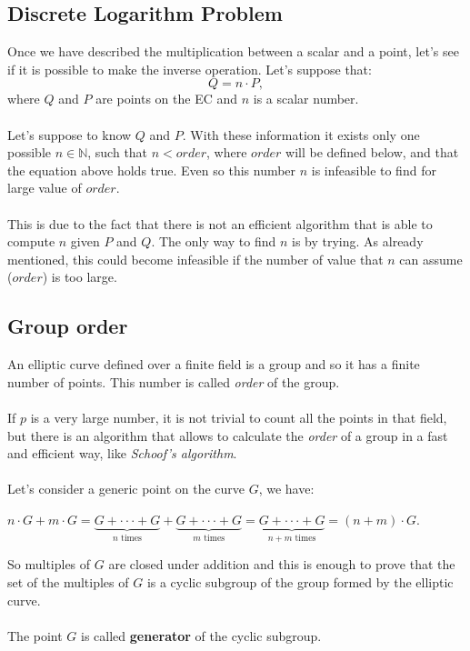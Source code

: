 \subsection{Discrete Logarithm Problem}
Once we have described the multiplication between a scalar and a point, let's see if it is possible to make the inverse operation. Let's suppose that:
\begin{equation*}
Q = n \cdot P,
\end{equation*}
where $Q$ and $P$ are points on the EC and $n$ is a scalar number. 
\\ \\ 
Let's suppose to know $Q$ and $P$. With these information it exists only one possible $n \in \mathbb{N}$, such that $ n<order$, where $order$ will be defined below, and that the equation above holds true. Even so this number $n$ is infeasible to find for large value of $order$.
\\ \\
This is due to the fact that there is not an efficient algorithm that is able to compute $n$ given $P$ and $Q$. The only way to find $n$ is by trying. As already mentioned, this could become infeasible if the number of value that $n$ can assume ($order$) is too large.

\subsection{Group order}
An elliptic curve defined over a finite field is a group and so it has a finite number of points. This number is called \textit{order} of the group.
\\ \\
If $p$ is a very large number, it is not trivial to count all the points in that field, but there is an algorithm that allows to calculate the \textit{order} of a group in a fast and efficient way, like \textit{Schoof's algorithm}.
\\ \\
Let's consider a generic point on the curve $G$, we have:
\begin{center} 
	$ n\cdot G+m\cdot G=\underbrace{
		G+\cdot \cdot \cdot+G
	}_{n\text{ times}}+
	\underbrace{
		G+\cdot \cdot \cdot+G
	}_{m\text{ times}}=
	\underbrace{
		G+\cdot \cdot \cdot+G
	}_{n+m\text{ times}} = 
	(n+m)\cdot G$.
\end{center}
So multiples of $G$ are closed under addition and this is enough to prove that the set of the multiples of $G$ is a cyclic subgroup of the group formed by the elliptic curve.
\\ \\
The point $G$ is called \textbf{generator} of the cyclic subgroup.

